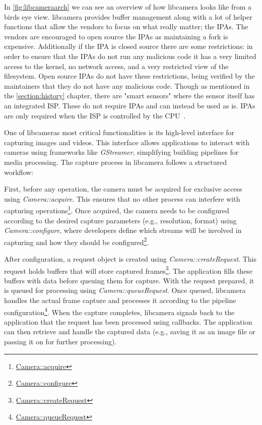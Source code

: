 In \cref{fig:libcameraarch} we can see an overview of how libcamera looks like
from a birds eye view. libcamera provides buffer management along with a lot of
helper functions that allow the vendors to focus on what really matter; the
IPAs. The vendors are encouraged to open source the IPAs as maintaining a fork
is expensive. Additionally if the IPA is closed source there are some
restrictions: in order to ensure that the IPAs do not run any malicious code it
has a very limited access to the kernel, no network access, and a very
restricted view of the filesystem. Open source IPAs do not have these
restrictions, being verified by the maintainers that they do not have any
malicious code. Though as mentioned in the \cref{section:history} chapter,
there are "smart sensors" where the sensor itself has an integrated ISP. These
do not require IPAs and can instead be used as is. IPAs are only required when
the ISP is controlled by the CPU~\cite{libcameraStack}.

One of libcameras most critical functionalities is its high-level interface
for capturing images and videos. This interface allows applications to
interact with cameras using frameworks like \textit{GStreamer}, simplifying
building pipelines for media processing. The capture process in libcamera
follows a structured workflow:

First, before any operation, the camera must be acquired for exclusive access
using \textit{Camera::acquire}. This ensures that no other process can interfere with
capturing operations\footnote{\href{https://libcamera.org/api-html/classlibcamera_1_1Camera.html\#a4e60f8015f64e5897394d6677e3fb274}{Camera::acquire}}.
Once acquired, the camera needs to be configured according to the desired
capture parameters (e.g., resolution, format) using \textit{Camera::configure}, where
developers define which streams will be involved in capturing and how they
should be configured\footnote{\href{https://libcamera.org/api-html/classlibcamera_1_1Camera.html\#a4c190f4c369628e5cd96770790559a26}{Camera::configure}}.

After configuration, a request object is created using \textit{Camera::createRequest}.
This request holds buffers that will store captured frames\footnote{\href{https://libcamera.org/api-html/classlibcamera_1_1Camera.html\#a5e5a9cdeef58daec5963b4715ecd4464}{Camera::createRequest}}.
The application fills these buffers with data before queuing them for capture.
With the request prepared, it is queued for processing using
\textit{Camera::queueRequest}. Once queued, libcamera handles the actual frame
capture and processes it according to the pipeline configuration\footnote{\href{https://libcamera.org/api-html/classlibcamera_1_1Camera.html\#a7017dfeac48e842d3e33c2c2eb217d62}{Camera::queueRequest}}.
When the capture completes, libcamera signals back to the application that the
request has been processed using callbacks. The application can then retrieve
and handle the captured data (e.g., saving it as an image file or passing it on
for further processing).

